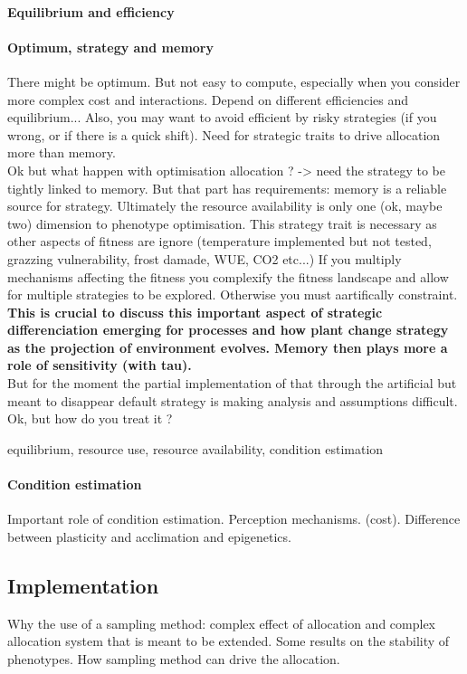 \paragraph{Equilibrium and efficiency}
\paragraph{Optimum, strategy and memory} There might be optimum. But not easy to compute, especially when you consider more complex cost and interactions. Depend on different efficiencies and equilibrium... Also, you may want to avoid efficient by risky strategies (if you wrong, or if there is a quick shift). Need for strategic traits to drive allocation more than memory.\\
Ok but what happen with optimisation allocation ? -> need the strategy to be tightly linked to memory. But that part has requirements: memory is a reliable source for strategy. Ultimately the resource availability is only one (ok, maybe two) dimension to phenotype optimisation. This strategy trait is necessary as other aspects of fitness are ignore (temperature implemented but not tested, grazzing vulnerability, frost damade, WUE, CO2 etc...) If you multiply mechanisms affecting the fitness you complexify the fitness landscape and allow for multiple strategies to be explored. Otherwise you must aartifically constraint. \\

\indent \textbf{This is crucial to discuss this important aspect of strategic differenciation emerging for processes and how plant change strategy as the projection of environment evolves. Memory then plays more a role of sensitivity (with tau).}\\
But for the moment the partial implementation of that through the artificial but meant to disappear default strategy is making analysis and assumptions difficult. Ok, but how do you treat it ? 

 equilibrium, resource use, resource availability, condition estimation
\paragraph{Condition estimation}
Important role of condition estimation. Perception mechanisms. (cost). Difference between plasticity and acclimation and epigenetics. 

\subsection{Implementation}
Why the use of a sampling method: complex effect of allocation and complex allocation system that is meant to be extended. Some results on the stability of phenotypes. How sampling method can drive the allocation.


